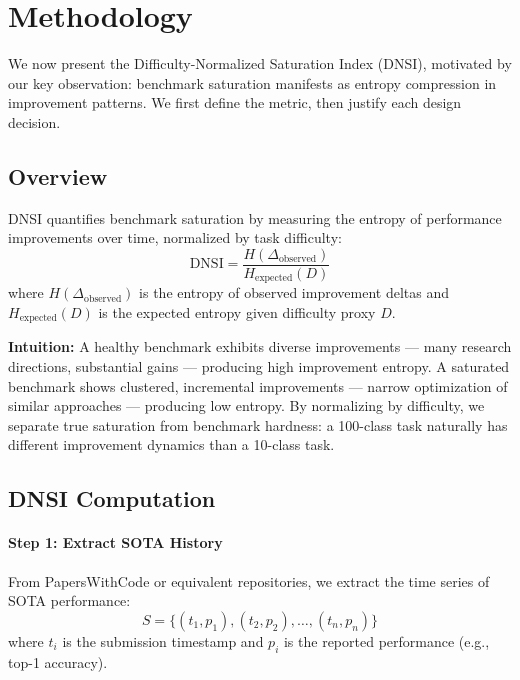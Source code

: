 \section{Methodology}
\label{sec:methodology}

We now present the Difficulty-Normalized Saturation Index (DNSI), motivated by our key observation: benchmark saturation manifests as entropy compression in improvement patterns. We first define the metric, then justify each design decision.

\subsection{Overview}

DNSI quantifies benchmark saturation by measuring the entropy of performance improvements over time, normalized by task difficulty:
\begin{equation}
\text{DNSI} = \frac{H(\Delta_{\text{observed}})}{H_{\text{expected}}(D)}
\end{equation}
where $H(\Delta_{\text{observed}})$ is the entropy of observed improvement deltas and $H_{\text{expected}}(D)$ is the expected entropy given difficulty proxy $D$.

\textbf{Intuition:} A healthy benchmark exhibits diverse improvements --- many research directions, substantial gains --- producing high improvement entropy. A saturated benchmark shows clustered, incremental improvements --- narrow optimization of similar approaches --- producing low entropy. By normalizing by difficulty, we separate true saturation from benchmark hardness: a 100-class task naturally has different improvement dynamics than a 10-class task.

\subsection{DNSI Computation}

\paragraph{Step 1: Extract SOTA History}
From PapersWithCode or equivalent repositories, we extract the time series of SOTA performance:
\begin{equation}
S = \{(t_1, p_1), (t_2, p_2), \ldots, (t_n, p_n)\}
\end{equation}
where $t_i$ is the submission timestamp and $p_i$ is the reported performance (e.g., top-1 accuracy).

